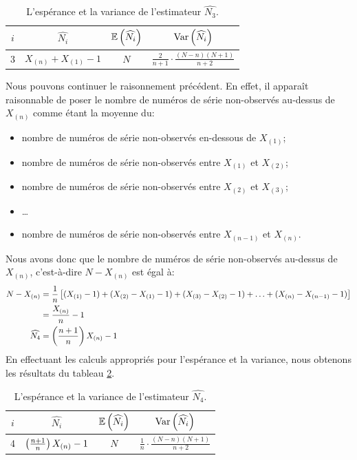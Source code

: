 \documentclass[10pt]{article}
\begin{document}
\begin{table}[ht]
\begin{center}
\begin{tabular}{|c|c|c|c|}
\hline
$i$ & $\widehat{N_i}$ & $\operatorname{\mathbb{E}}\left(\widehat{N_i}\right)$ & $\operatorname{Var}\left(\widehat{N_i}\right)$ \\
\hline
\hline
3 & $X_{(n)}+X_{(1)}-1$ & $N$ & $\frac{2}{n+1}\cdot\frac{(N-n)(N+1)}{n+2}$ \\
\hline
\end{tabular}
\end{center}
\caption{\label{tab:estimateur_n3} {L'espérance et la variance de l'estimateur $\widehat{N_3}$.} }
\end{table}

Nous pouvons continuer le raisonnement précédent. En effet, il apparaît
raisonnable de poser le nombre de numéros de série non-observés
au-dessus de \(X_{(n)}\) comme étant la moyenne du:

\begin{itemize}
\item
  nombre de numéros de série non-observés en-dessous de \(X_{(1)}\);
\item
  nombre de numéros de série non-observés entre \(X_{(1)}\) et
  \(X_{(2)}\);
\item
  nombre de numéros de série non-observés entre \(X_{(2)}\) et
  \(X_{(3)}\);
\item
  \ldots{}
\item
  nombre de numéros de série non-observés entre \(X_{(n-1)}\) et
  \(X_{(n)}\).
\end{itemize}

Nous avons donc que le nombre de numéros de série non-observés au-dessus
de \(X_{(n)}\), c'est-à-dire \(N-X_{(n)}\) est égal à: \begin{align*}
N-X_{(n)} &= \frac{1}{n}\left[ (X_{(1)}-1)+(X_{(2)}-X_{(1)}-1)+(X_{(3)}-X_{(2)}-1)+\ldots+(X_{(n)}-X_{(n-1)}-1) \right] \\
&= \frac{X_{(n)}}{n}-1 \\
\widehat{N_4} &= \left(\frac{n+1}{n}\right) X_{(n)}-1
\end{align*} En effectuant les calculs appropriés pour l'espérance et la
variance, nous obtenons les résultats du tableau
\ref{tab:estimateur_n4}.

\begin{table}[ht]
\begin{center}
\begin{tabular}{|c|c|c|c|}
\hline
$i$ & $\widehat{N_i}$ & $\operatorname{\mathbb{E}}\left(\widehat{N_i}\right)$ & $\operatorname{Var}\left(\widehat{N_i}\right)$ \\
\hline
\hline
4 & $\left(\frac{n+1}{n}\right) X_{(n)}-1$ & $N$ & $\frac{1}{n}\cdot\frac{(N-n)(N+1)}{n+2}$ \\
\hline
\end{tabular}
\end{center}
\caption{\label{tab:estimateur_n4} {L'espérance et la variance de l'estimateur $\widehat{N_4}$.} }
\end{table}
\end{document}
